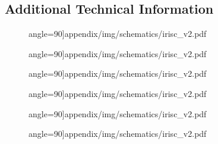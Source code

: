 \newpage
\begin{landscape}
\section{Additional Technical Information}\label{sec:appC}

\begin{figure}[h!]
	 angle=90]{appendix/img/schematics/irisc_v2.pdf}
\end{figure}
\newpage
\begin{figure}[h!]
		 angle=90]{appendix/img/schematics/irisc_v2.pdf}
\end{figure}
\newpage
\begin{figure}[h!]
		 angle=90]{appendix/img/schematics/irisc_v2.pdf}
\end{figure}
\newpage
\begin{figure}[h!]
		 angle=90]{appendix/img/schematics/irisc_v2.pdf}
\end{figure}
\newpage
\begin{figure}[h!]
		 angle=90]{appendix/img/schematics/irisc_v2.pdf}
\end{figure}
\newpage
\begin{figure}[h!]
		 angle=90]{appendix/img/schematics/irisc_v2.pdf}
\end{figure}
\end{landscape}



% 
% 
% 
% 
% 




% 

